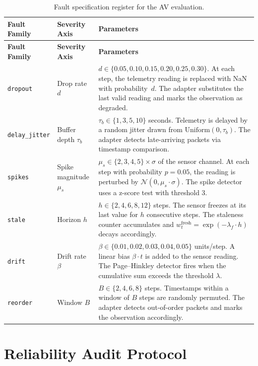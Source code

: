 \begin{longtable}{lp{2.5cm}p{7.5cm}}
\caption{Fault specification register for the AV evaluation.}\label{tab:fault_spec_register}\\
\toprule
\textbf{Fault Family} & \textbf{Severity Axis} & \textbf{Parameters} \\
\midrule
\endfirsthead
\toprule
\textbf{Fault Family} & \textbf{Severity Axis} & \textbf{Parameters} \\
\midrule
\endhead
\texttt{dropout} & Drop rate $d$ &
  $d \in \{0.05, 0.10, 0.15, 0.20, 0.25, 0.30\}$.
  At each step, the telemetry reading is replaced with NaN with probability~$d$.
  The adapter substitutes the last valid reading and marks the observation as
  degraded. \\
\midrule
\texttt{delay\_jitter} & Buffer depth $\tau_b$ &
  $\tau_b \in \{1, 3, 5, 10\}$ seconds.
  Telemetry is delayed by a random jitter drawn from $\mathrm{Uniform}(0, \tau_b)$.
  The adapter detects late-arriving packets via timestamp comparison. \\
\midrule
\texttt{spikes} & Spike magnitude $\mu_s$ &
  $\mu_s \in \{2, 3, 4, 5\}\times\sigma$ of the sensor channel.
  At each step with probability $p = 0.05$, the reading is perturbed by
  $\mathcal{N}(0, \mu_s \cdot \sigma)$.  The spike detector uses a z-score test
  with threshold 3. \\
\midrule
\texttt{stale} & Horizon $h$ &
  $h \in \{2, 4, 6, 8, 12\}$ steps.
  The sensor freezes at its last value for $h$ consecutive steps.  The staleness
  counter accumulates and $w_t^{\mathrm{fresh}} = \exp(-\lambda_f \cdot h)$
  decays accordingly. \\
\midrule
\texttt{drift} & Drift rate $\beta$ &
  $\beta \in \{0.01, 0.02, 0.03, 0.04, 0.05\}$ units/step.
  A linear bias $\beta \cdot t$ is added to the sensor reading.  The
  Page--Hinkley detector fires when the cumulative sum exceeds the threshold
  $\lambda$. \\
\midrule
\texttt{reorder} & Window $B$ &
  $B \in \{2, 4, 6, 8\}$ steps.
  Timestamps within a window of $B$ steps are randomly permuted.  The adapter
  detects out-of-order packets and marks the observation accordingly. \\
\bottomrule
\end{longtable}

\section{Reliability Audit Protocol}\label{app:reliability_audit}

